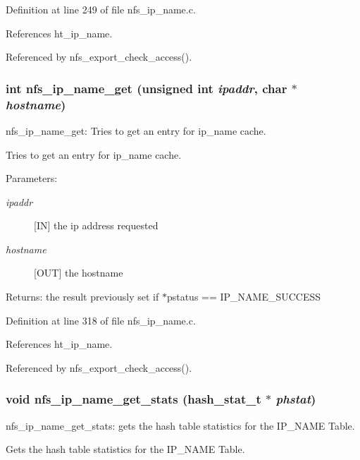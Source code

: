 Definition at line 249 of file nfs\_\-ip\_\-name.c.

References ht\_\-ip\_\-name.

Referenced by nfs\_\-export\_\-check\_\-access().
\subsubsection{\setlength{\rightskip}{0pt plus 5cm}int nfs\_\-ip\_\-name\_\-get (unsigned int {\em ipaddr}, char $\ast$ {\em hostname})}\label{nfs__ip__name_8c_a9}


nfs\_\-ip\_\-name\_\-get: Tries to get an entry for ip\_\-name cache.

Tries to get an entry for ip\_\-name cache.

\begin{Desc}
\item[Parameters:]
\begin{description}
\item[{\em ipaddr}][IN] the ip address requested \item[{\em hostname}][OUT] the hostname\end{description}
\end{Desc}
\begin{Desc}
\item[Returns:]the result previously set if $\ast$pstatus == IP\_\-NAME\_\-SUCCESS \end{Desc}


Definition at line 318 of file nfs\_\-ip\_\-name.c.

References ht\_\-ip\_\-name.

Referenced by nfs\_\-export\_\-check\_\-access().
\subsubsection{\setlength{\rightskip}{0pt plus 5cm}void nfs\_\-ip\_\-name\_\-get\_\-stats (hash\_\-stat\_\-t $\ast$ {\em phstat})}\label{nfs__ip__name_8c_a13}


nfs\_\-ip\_\-name\_\-get\_\-stats: gets the hash table statistics for the IP\_\-NAME Table.

Gets the hash table statistics for the IP\_\-NAME Table.

